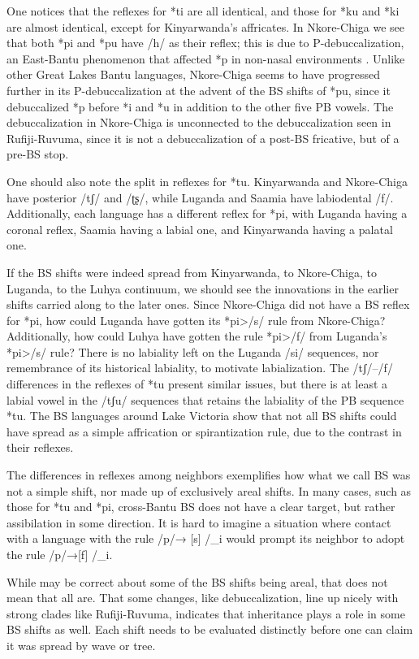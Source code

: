 \documentclass[output=paper,colorlinks,citecolor=brown
]{langscibook}
\begin{document}
One notices that the reflexes for *ti are all identical, and those for *ku and *ki are almost identical, except for Kinyarwanda’s affricates. In Nkore-Chiga we see that both *pi and *pu have /h/ as their reflex; this is due to P-debuccalization, an East-Bantu phenomenon that affected *p in non-nasal environments \citep{nurse1999}. Unlike other Great Lakes Bantu languages, Nkore-Chiga seems to have progressed further in its P-debuccalization at the advent of the BS shifts of *pu, since it debuccalized *p before *i and *u in addition to the other five PB vowels. The debuccalization in Nkore-Chiga is unconnected to the debuccalization seen in Rufiji-Ruvuma, since it is not a debuccalization of a post-BS fricative, but of a pre-BS stop.

One should also note the split in reflexes for *tu. Kinyarwanda and Nkore-Chiga have posterior /tʃ/ and /ʈʂ/, while Luganda and Saamia have labiodental /f/. Additionally, each language has a different reflex for *pi, with Luganda having a coronal reflex, Saamia having a labial one, and Kinyarwanda having a palatal one.

If the BS shifts were indeed spread from Kinyarwanda, to Nkore-Chiga, to Luganda, to the Luhya continuum, we should see the innovations in the earlier shifts carried along to the later ones. Since Nkore-Chiga did not have a BS reflex for *pi, how could Luganda have gotten its *pi>/s/ rule from Nkore-Chiga? Additionally, how could Luhya have gotten the rule *pi>/f/ from Luganda’s *pi>/s/ rule? There is no labiality left on the Luganda /si/ sequences, nor remembrance of its historical labiality, to motivate labialization. The /tʃ/--/f/ differences in the reflexes of *tu present similar issues, but there is at least a labial vowel in the /tʃu/ sequences that retains the labiality of the PB sequence *tu. The BS languages around Lake Victoria show that not all BS shifts could have spread as a simple affrication or spirantization rule, due to the contrast in their reflexes.

The differences in reflexes among neighbors exemplifies how what we call BS was not a simple shift, nor made up of exclusively areal shifts. In many cases, such as those for *tu and *pi, cross-Bantu BS does not have a clear target, but rather assibilation in some direction. It is hard to imagine a situation where contact with a language with the rule /p/→ [s] /\_i  would prompt its neighbor to adopt the rule /p/→[f] /\_i.

While \citeauthor{Janson2007} may be correct about some of the BS shifts being areal, that does not mean that all are. That some changes, like debuccalization, line up nicely with strong clades like Rufiji-Ruvuma, indicates that inheritance plays a role in some BS shifts as well. Each shift needs to be evaluated distinctly before one can claim it was spread by wave or tree.
\end{document}
